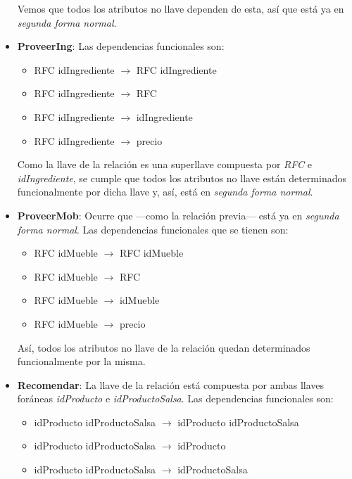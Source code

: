 \documentclass[11pt,letterpaper]{article}
\begin{document}
\begin{itemize}
Vemos que todos los atributos no llave dependen de esta, así que está ya en \textit{segunda forma normal}.

\item \textbf{ProveerIng}: Las dependencias funcionales son:

\begin{itemize}
\item RFC idIngrediente $\rightarrow$ RFC idIngrediente

\item RFC idIngrediente $\rightarrow$ RFC 
\item RFC idIngrediente $\rightarrow$ idIngrediente
\item RFC idIngrediente $\rightarrow$ precio
\end{itemize}

Como la llave de la relación es una superllave compuesta por \textit{RFC} e \textit{idIngrediente}, se cumple que todos los atributos no llave están determinados funcionalmente por dicha llave y, así, está en \textit{segunda forma normal}.

\item \textbf{ProveerMob}: Ocurre que ---como la relación previa--- está ya en \textit{segunda forma normal}. Las dependencias funcionales que se tienen son:

\begin{itemize}
\item RFC idMueble $\rightarrow$ RFC idMueble

\item RFC idMueble $\rightarrow$ RFC 
\item RFC idMueble $\rightarrow$ idMueble
\item RFC idMueble $\rightarrow$ precio
\end{itemize}

Así, todos los atributos no llave de la relación quedan determinados funcionalmente por la misma.
\item \textbf{Recomendar}: La llave de la relación está compuesta por ambas llaves foráneas \textit{idProducto} e \textit{idProductoSalsa}. Las dependencias funcionales son:

\begin{itemize}
\item idProducto idProductoSalsa $\rightarrow$ idProducto idProductoSalsa

\item idProducto idProductoSalsa $\rightarrow$ idProducto 
\item idProducto idProductoSalsa $\rightarrow$ idProductoSalsa


\end{itemize}
\end{itemize}
\end{document}
